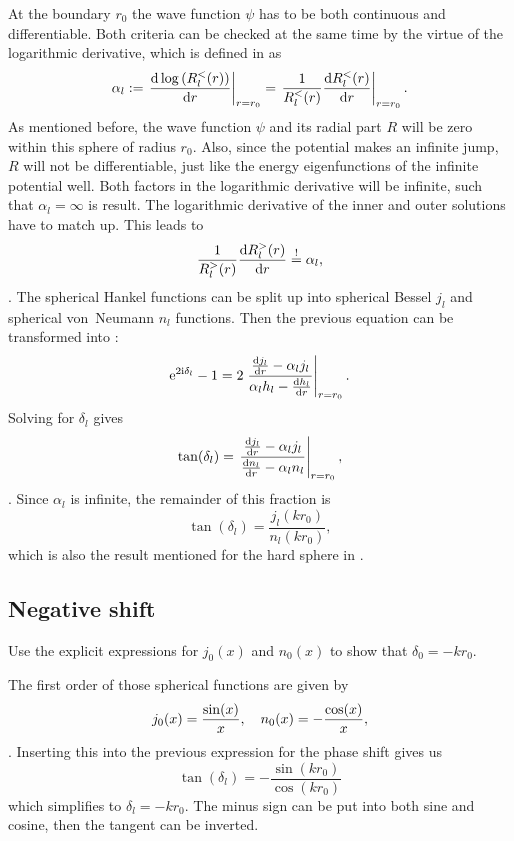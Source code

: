 \documentclass[11pt, english, fleqn, DIV=15, headinclude, BCOR=1.5cm]{scrartcl}
\begin{document}
At the boundary $r_0$ the wave function $\psi$ has to be both continuous and
differentiable. Both criteria can be checked at the same time by the virtue of
the logarithmic derivative, which is defined in
\parencite[(18.60)]{Schwabl/Quantenmechanik} as
\[
    \alpha_l := \left. \frac{\mathop{}\!\mathrm d {\,\log\left( R_l^<(r) \right)}}{\mathop{}\!\mathrm d {r}} \right|_{r = r_0}
    = \left. \frac{1}{R_l^<(r)} \frac{\mathop{}\!\mathrm d {R_l^<(r)}}{\mathop{}\!\mathrm d {r}} \right|_{r = r_0}.
\]
As mentioned before, the wave function $\psi$ and its radial part $R$ will be
zero within this sphere of radius $r_0$. Also, since the potential makes an
infinite jump, $R$ will not be differentiable, just like the energy
eigenfunctions of the infinite potential well. Both factors in the logarithmic
derivative will be infinite, such that $\alpha_l = \infty$ is result. The
logarithmic derivative of the inner and outer solutions have to match up. This
leads to
\[
    \frac{1}{R_l^>(r)} \frac{\mathop{}\!\mathrm d {R_l^>(r)}}{\mathop{}\!\mathrm d {r}} \overset != \alpha_l,
\]
\parencite[(18.61)]{Schwabl/Quantenmechanik}. The spherical Hankel functions
can be split up into spherical Bessel $j_l$ and spherical von~Neumann $n_l$
functions. Then the previous equation can be transformed into
\parencite[(18.62)]{Schwabl/Quantenmechanik}:
\[
    \mathrm e^{2 \mathrm i \delta_l} -1 = 2 \left. \frac{\frac{\mathop{}\!\mathrm d {j_l}}{\mathop{}\!\mathrm d {r}} - \alpha_l j_l}{\alpha_l h_l
    - \frac{\mathop{}\!\mathrm d {h_l}}{\mathop{}\!\mathrm d {r}}} \right|_{r=r_0}.
\]
Solving for $\delta_l$ gives
\[
    \tan(\delta_l) = \left. \frac{\frac{\mathop{}\!\mathrm d {j_l}}{\mathop{}\!\mathrm d {r}} - \alpha_l j_l}{\frac{\mathop{}\!\mathrm d {n_l}}{\mathop{}\!\mathrm d {r}} - \alpha_l
    n_l} \right|_{r=r_0},
\]
\parencite[(18.62)]{Schwabl/Quantenmechanik}. Since $\alpha_l$ is infinite, the
remainder of this fraction is
\[
    \tan(\delta_l) = \frac{j_l(kr_0)}{n_l(kr_0)},
\]
which is also the result mentioned for the hard sphere in
\parencite[(18.63)]{Schwabl/Quantenmechanik}.

\subsection{Negative shift}

\begin{problem}
    Use the explicit expressions for $j_0(x)$ and $n_0(x)$ to show that
    $\delta_0 = - kr_0$.
\end{problem}

The first order of those spherical functions are given by
\[
    j_0(x) = \frac{\sin(x)}{x}
    ,\quad
    n_0(x) = - \frac{\cos(x)}{x},
\]
\parencite{MathWorld/BesselFunctionoftheSecondKind,MathWorld/BesselFunctionoftheFirstKind}.
Inserting this into the previous expression for the phase shift gives us
\[
    \tan(\delta_l) = - \frac{\sin(kr_0)}{\cos(kr_0)}
\]
which simplifies to $\delta_l = - kr_0$. The minus sign can be put into both
sine and cosine, then the tangent can be inverted.
\end{document}
